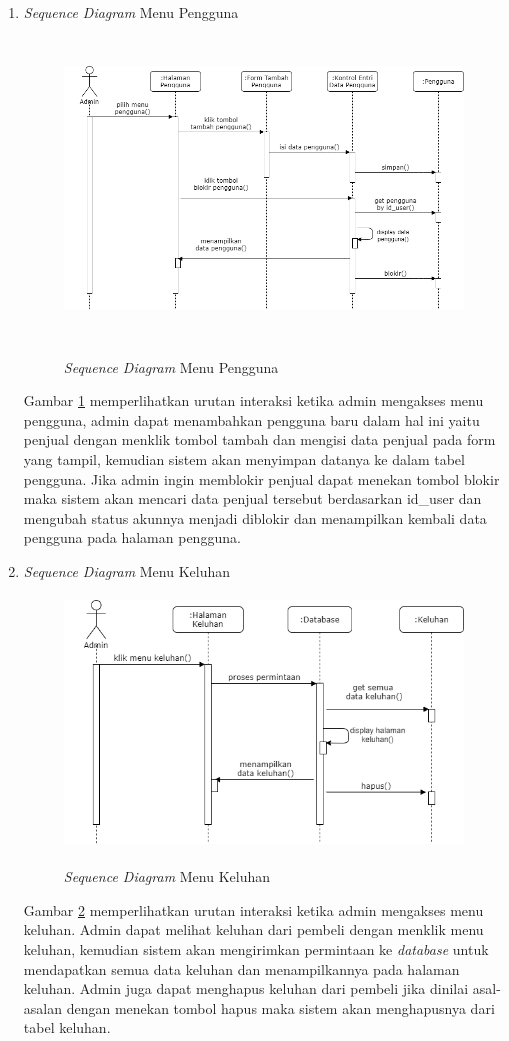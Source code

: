 \begin{enumerate}
	\newpage
	\item \textit{Sequence Diagram} Menu Pengguna
	\begin{figure}[H]
		\centering
		{\includegraphics [width = 12cm, height= 8cm]{gambar/sequence/tambah, blokir pengguna}}
		\caption{\textit{Sequence Diagram} Menu Pengguna}
		\label{seq pengguna}
	\end{figure}
	\par Gambar \ref*{seq pengguna} memperlihatkan urutan interaksi ketika admin mengakses menu pengguna, admin dapat menambahkan pengguna baru dalam hal ini yaitu penjual dengan menklik tombol tambah dan mengisi data penjual pada form yang tampil, kemudian sistem akan menyimpan datanya ke dalam tabel pengguna. Jika admin ingin memblokir penjual dapat menekan tombol blokir maka sistem akan mencari data penjual tersebut berdasarkan id\_user dan mengubah status akunnya menjadi diblokir dan menampilkan kembali data pengguna pada halaman pengguna.

	\item \textit{Sequence Diagram} Menu Keluhan
	\begin{figure}[H]
		\centering
		{\includegraphics [width = 11cm, height= 6.7cm]{gambar/sequence/keluhan}}
		\caption{\textit{Sequence Diagram} Menu Keluhan}
		\label{seq keluhan}
	\end{figure}
	\par Gambar \ref*{seq keluhan} memperlihatkan urutan interaksi ketika admin mengakses menu keluhan. Admin dapat melihat keluhan dari pembeli dengan menklik menu keluhan, kemudian sistem akan mengirimkan permintaan ke \textit{database} untuk mendapatkan semua data keluhan dan menampilkannya pada halaman keluhan. Admin juga dapat menghapus keluhan dari pembeli jika dinilai asal-asalan dengan menekan tombol hapus maka sistem akan menghapusnya dari tabel keluhan.


\end{enumerate}
